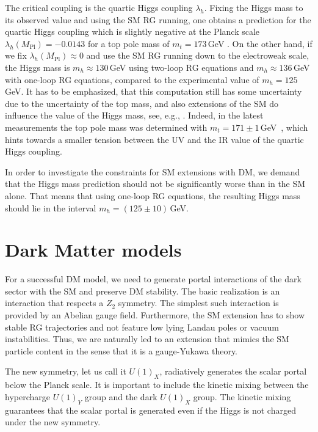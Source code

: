 \documentclass[aps,prd,twocolumn,preprintnumbers,superscriptaddress,nobibnotes,floatfix,longbibliography]{revtex4-1}
\begin{document}
The critical coupling is the quartic Higgs coupling $\lambda_h$.
Fixing the Higgs mass to its observed value and using the SM RG running, one obtains a prediction for the quartic Higgs coupling which is slightly negative at the Planck scale $\lambda_h(M_\text{Pl})= -0.0143$ for a top pole mass of $m_t=173$\,GeV \cite{Buttazzo:2013uya}.
On the other hand, if we fix $\lambda_h(M_\text{Pl})\approx 0$ and use the SM RG running down to the electroweak scale, the Higgs mass is $m_h\approx130$\,GeV using two-loop RG equations and $m_h\approx136$\,GeV with one-loop RG equations, compared to the experimental value of $m_h= 125$\,GeV.
It has to be emphasized, that this computation still has some uncertainty due to the uncertainty of the top mass,
and also extensions of the SM do influence the value of the Higgs mass, see, e.g., \cite{Kwapisz:2019wrl}.
Indeed, in the latest measurements the top pole mass was determined with $m_t=171\pm 1$\,GeV~\cite{1904.05237,1905.02302},
which hints towards a smaller tension between the UV and the IR value of the quartic Higgs coupling.

In order to investigate the constraints for SM extensions with DM, we demand that the Higgs mass prediction should not be significantly worse than in the SM alone. 
That means that using one-loop RG equations, the resulting Higgs mass should lie in the interval $m_h=(125\pm 10)$\,GeV.


\section{Dark Matter models}
\label{sec:DM}
For a successful DM model, we need to generate portal interactions of the dark sector with the SM and preserve DM stability.
The basic realization is an interaction that respects a $Z_2$ symmetry. The simplest such interaction is provided by an Abelian gauge field. 
Furthermore, the SM extension has to show stable RG trajectories and not feature low lying Landau poles or vacuum instabilities. Thus, we are naturally led to an extension that mimics the SM particle content in the sense that it is a gauge-Yukawa theory.  

The new symmetry, let us call it $U(1)_X$, radiatively generates the scalar portal below the Planck scale.
It is important to include the kinetic mixing between the hypercharge $U(1)_Y$ group and the dark $U(1)_X$ group.
The kinetic mixing guarantees that the scalar portal is generated even if the Higgs is not charged under the new symmetry.
\end{document}
